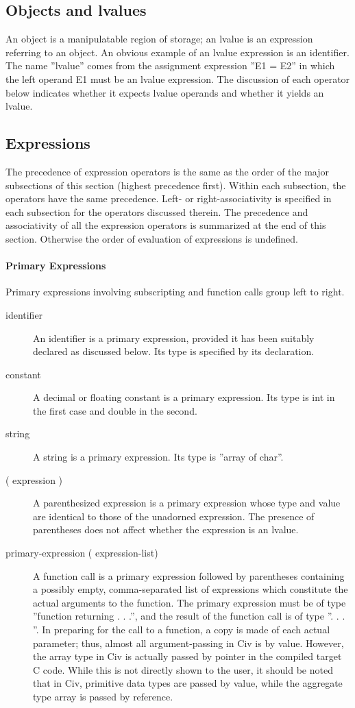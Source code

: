 \documentclass[a4paper]{article}
\begin{document}
\subsection{Objects and lvalues}
An object is a manipulatable region of storage; an lvalue is an expression referring to an object. An obvious example of an lvalue expression is an identifier. The name ''lvalue'' comes from the assignment expression ''E1 = E2'' in which the left operand E1 must be an lvalue expression.
The discussion of each operator below indicates whether it expects lvalue operands and whether it yields an lvalue.

\subsection{Expressions}
The precedence of expression operators is the same as the order of the major subsections of this section (highest precedence first). Within each subsection, the operators have the same precedence. Left- or right-associativity is specified in each subsection for the operators discussed therein. The precedence and associativity of all the expression operators is summarized at the end of this section. Otherwise the order of evaluation of expressions is undefined.

\paragraph{Primary Expressions}
Primary expressions involving subscripting and function calls group left to right.
\begin{description}
\item[identifier] An identifier is a primary expression, provided it has been suitably declared as discussed below. Its type is specified by its declaration.
\item[constant]
A decimal or floating constant is a primary expression. Its type is int in the first case and double in the second.
\item[string]
A string is a primary expression. Its type is ''array of char''.
\item[( expression )]
A parenthesized expression is a primary expression whose type and value are identical to those of the unadorned expression. The presence of parentheses does not affect whether the expression is an lvalue.
\item[primary-expression ( expression-list)]
A function call is a primary expression followed by parentheses containing a possibly empty, comma-separated list of expressions which constitute the actual arguments to the function. The primary expression must be of type ''function returning . . .'', and the result of the function call is of type ''. . . ''. In preparing for the call to a function, a copy is made of each actual parameter; thus, almost all argument-passing in Civ is by value. However, the array type in Civ is actually passed by pointer in the compiled target C code. While this is not directly shown to the user, it should be noted that in Civ, primitive data types are passed by value, while the aggregate type array is passed by reference. 
\end{description}
\end{document}
